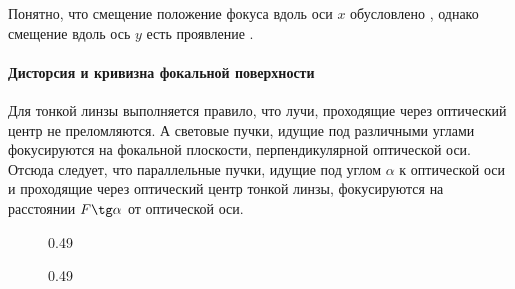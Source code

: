 Понятно, что смещение положение фокуса вдоль оси $x$ обусловлено , однако смещение вдоль ось $y$ есть проявление .

\paragraph{Дисторсия и кривизна фокальной поверхности}
Для тонкой линзы выполняется правило, что лучи, проходящие через оптический центр не преломляются. А световые пучки, идущие под различными углами фокусируются на фокальной плоскости, перпендикулярной оптической оси. Отсюда следует, что параллельные пучки, идущие под углом $\alpha$ к оптической оси и проходящие через оптический центр тонкой линзы, фокусируются на расстоянии $F \tg \alpha$ от оптической оси. 

\begin{figure}[h]
    \begin{subcaptionblock}{0.49\tw}
        \caption{}
        \label{pic:pitzval}
    \end{subcaptionblock}
    \hfill
    \begin{subcaptionblock}{0.49\tw}
        \caption{}
        \label{pic:distorsion-y}
    \end{subcaptionblock}
    \caption{}
\end{figure}

